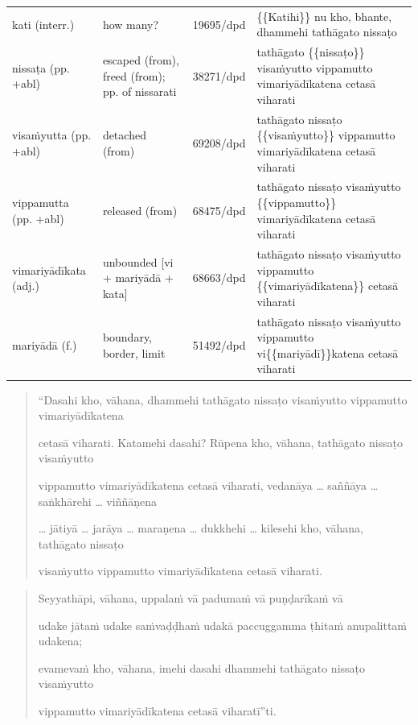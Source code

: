\documentclass[11pt,oneside]{memoir}
\begin{document}
\begin{longtable}{L{\colOne} L{\colTwo} H H}
kati (interr.) & how many? & 19695/dpd & \{\{Katihi\}\} nu kho, bhante, dhammehi tathāgato nissaṭo\\[0pt]
nissaṭa (pp. +abl) & escaped (from), freed (from); pp. of nissarati & 38271/dpd & tathāgato \{\{nissaṭo\}\} visaṁyutto vippamutto vimariyādīkatena cetasā viharati\\[0pt]
visaṁyutta (pp. +abl) & detached (from) & 69208/dpd & tathāgato nissaṭo \{\{visaṁyutto\}\} vippamutto vimariyādīkatena cetasā viharati\\[0pt]
vippamutta (pp. +abl) & released (from) & 68475/dpd & tathāgato nissaṭo visaṁyutto \{\{vippamutto\}\} vimariyādīkatena cetasā viharati\\[0pt]
vimariyādīkata (adj.) & unbounded [vi + mariyādā + kata] & 68663/dpd & tathāgato nissaṭo visaṁyutto vippamutto \{\{vimariyādīkatena\}\} cetasā viharati\\[0pt]
mariyādā (f.) & boundary, border, limit & 51492/dpd & tathāgato nissaṭo visaṁyutto vippamutto vi\{\{mariyādī\}\}katena cetasā viharati\\[0pt]
\end{longtable}

\begin{quote}
“Dasahi kho, vāhana, dhammehi tathāgato nissaṭo visaṁyutto vippamutto vimariyādīkatena

cetasā viharati. Katamehi dasahi? Rūpena kho, vāhana, tathāgato nissaṭo visaṁyutto

vippamutto vimariyādīkatena cetasā viharati, vedanāya \ldots{} saññāya \ldots{} saṅkhārehi \ldots{} viññāṇena

\ldots{} jātiyā \ldots{} jarāya \ldots{} maraṇena \ldots{} dukkhehi \ldots{} kilesehi kho, vāhana, tathāgato nissaṭo

visaṁyutto vippamutto vimariyādīkatena cetasā viharati.
\end{quote}

\clearpage
\casesLegendHeaderBGHere

\begin{quote}
Seyyathāpi, vāhana, uppalaṁ vā padumaṁ vā puṇḍarīkaṁ vā

udake jātaṁ udake saṁvaḍḍhaṁ udakā paccuggamma ṭhitaṁ anupalittaṁ udakena;

evamevaṁ kho, vāhana, imehi dasahi dhammehi tathāgato nissaṭo visaṁyutto

vippamutto vimariyādīkatena cetasā viharatī”ti.
\end{quote}
\end{document}
